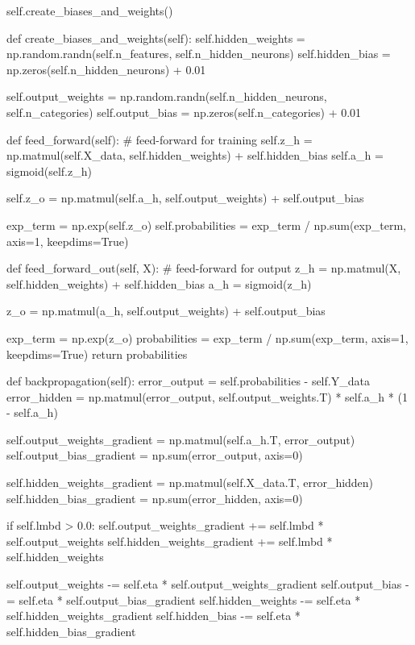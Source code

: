 \documentclass[%
oneside,                 %
final,                   %
10pt]{article}
\begin{document}
        self.create_biases_and_weights()

    def create_biases_and_weights(self):
        self.hidden_weights = np.random.randn(self.n_features, self.n_hidden_neurons)
        self.hidden_bias = np.zeros(self.n_hidden_neurons) + 0.01

        self.output_weights = np.random.randn(self.n_hidden_neurons, self.n_categories)
        self.output_bias = np.zeros(self.n_categories) + 0.01

    def feed_forward(self):
        # feed-forward for training
        self.z_h = np.matmul(self.X_data, self.hidden_weights) + self.hidden_bias
        self.a_h = sigmoid(self.z_h)

        self.z_o = np.matmul(self.a_h, self.output_weights) + self.output_bias

        exp_term = np.exp(self.z_o)
        self.probabilities = exp_term / np.sum(exp_term, axis=1, keepdims=True)

    def feed_forward_out(self, X):
        # feed-forward for output
        z_h = np.matmul(X, self.hidden_weights) + self.hidden_bias
        a_h = sigmoid(z_h)

        z_o = np.matmul(a_h, self.output_weights) + self.output_bias
        
        exp_term = np.exp(z_o)
        probabilities = exp_term / np.sum(exp_term, axis=1, keepdims=True)
        return probabilities

    def backpropagation(self):
        error_output = self.probabilities - self.Y_data
        error_hidden = np.matmul(error_output, self.output_weights.T) * self.a_h * (1 - self.a_h)

        self.output_weights_gradient = np.matmul(self.a_h.T, error_output)
        self.output_bias_gradient = np.sum(error_output, axis=0)

        self.hidden_weights_gradient = np.matmul(self.X_data.T, error_hidden)
        self.hidden_bias_gradient = np.sum(error_hidden, axis=0)

        if self.lmbd > 0.0:
            self.output_weights_gradient += self.lmbd * self.output_weights
            self.hidden_weights_gradient += self.lmbd * self.hidden_weights

        self.output_weights -= self.eta * self.output_weights_gradient
        self.output_bias -= self.eta * self.output_bias_gradient
        self.hidden_weights -= self.eta * self.hidden_weights_gradient
        self.hidden_bias -= self.eta * self.hidden_bias_gradient
\end{document}
